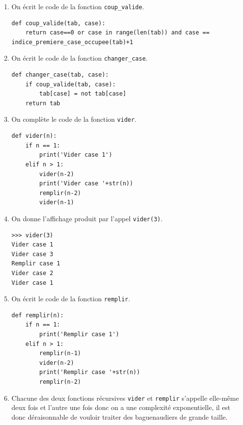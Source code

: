 \documentclass[11pt,a4paper]{article}
\newcommand{\mip}[1]{\texttt{#1}}
\begin{document}
\begin{enumerate}
\item On écrit le code de la fonction \mip{coup_valide}.

\begin{verbatim}
def coup_valide(tab, case):
    return case==0 or case in range(len(tab)) and case == indice_premiere_case_occupee(tab)+1
\end{verbatim}


\item On écrit le code de la fonction \mip{changer_case}.

\begin{verbatim}
def changer_case(tab, case):
    if coup_valide(tab, case):
        tab[case] = not tab[case]
    return tab
\end{verbatim}


\item On complète le code de la fonction \mip{vider}.

\begin{verbatim}
def vider(n):
    if n == 1:
        print('Vider case 1')
    elif n > 1:
        vider(n-2)
        print('Vider case '+str(n))
        remplir(n-2)
        vider(n-1)
\end{verbatim}


\item On donne l'affichage produit par l'appel \mip{vider(3)}.


\begin{verbatim}
>>> vider(3)
Vider case 1
Vider case 3
Remplir case 1
Vider case 2
Vider case 1
\end{verbatim}


\item On écrit le code de la fonction \mip{remplir}.

\begin{verbatim}
def remplir(n):
    if n == 1:
        print('Remplir case 1')
    elif n > 1:
        remplir(n-1)
        vider(n-2)
        print('Remplir case '+str(n))
        remplir(n-2)
\end{verbatim}

\item Chacune des deux fonctions récursives \mip{vider} et \mip{remplir} s'appelle elle-même deux fois et l'autre une fois donc on a une complexité exponentielle, il est donc déraisonnable de vouloir traiter des baguenaudiers de grande taille.
 
\end{enumerate}
\end{document}
